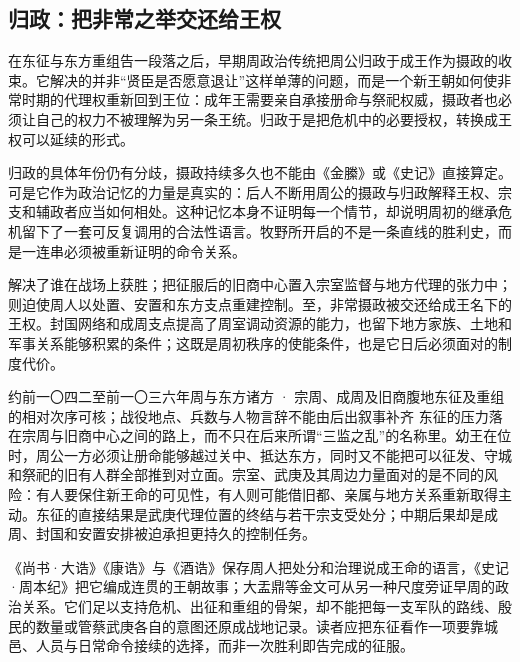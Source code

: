 \subsection{归政：把非常之举交还给王权}


在东征与东方重组告一段落之后，早期周政治传统把周公归政于成王作为摄政的收束。它解决的并非“贤臣是否愿意退让”这样单薄的问题，而是一个新王朝如何使非常时期的代理权重新回到王位：成年王需要亲自承接册命与祭祀权威，摄政者也必须让自己的权力不被理解为另一条王统。归政于是把危机中的必要授权，转换成王权可以延续的形式。

归政的具体年份仍有分歧，摄政持续多久也不能由《金縢》或《史记》直接算定。可是它作为政治记忆的力量是真实的：后人不断用周公的摄政与归政解释王权、宗支和辅政者应当如何相处。这种记忆本身不证明每一个情节，却说明周初的继承危机留下了一套可反复调用的合法性语言。牧野所开启的不是一条直线的胜利史，而是一连串必须被重新证明的命令关系。

\begin{causalchain}[从胜利到可持续的王命]
解决了谁在战场上获胜；把征服后的旧商中心置入宗室监督与地方代理的张力中；则迫使周人以处置、安置和东方支点重建控制。至，非常摄政被交还给成王名下的王权。封国网络和成周支点提高了周室调动资源的能力，也留下地方家族、土地和军事关系能够积累的条件；这既是周初秩序的使能条件，也是它日后必须面对的制度代价。
\end{causalchain}

\begin{event}{}{约前一〇四二至前一〇三六年}{周与东方诸方 · 宗周、成周及旧商腹地}{东征及重组的相对次序可核；战役地点、兵数与人物言辞不能由后出叙事补齐}
东征的压力落在宗周与旧商中心之间的路上，而不只在后来所谓“三监之乱”的名称里。幼王在位时，周公一方必须让册命能够越过关中、抵达东方，同时又不能把可以征发、守城和祭祀的旧有人群全部推到对立面。宗室、武庚及其周边力量面对的是不同的风险：有人要保住新王命的可见性，有人则可能借旧都、亲属与地方关系重新取得主动。东征的直接结果是武庚代理位置的终结与若干宗支受处分；中期后果却是成周、封国和安置安排被迫承担更持久的控制任务。

《尚书·大诰》《康诰》与《酒诰》保存周人把处分和治理说成王命的语言，《史记·周本纪》把它编成连贯的王朝故事；大盂鼎等金文可从另一种尺度旁证早周的政治关系。它们足以支持危机、出征和重组的骨架，却不能把每一支军队的路线、殷民的数量或管蔡武庚各自的意图还原成战地记录。读者应把东征看作一项要靠城邑、人员与日常命令接续的选择，而非一次胜利即告完成的征服。
\end{event}
